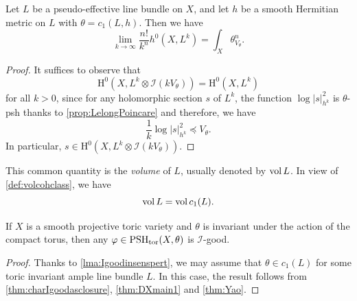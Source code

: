 \begin{corollary}\label{cor:volbigL}
Let $L$ be a pseudo-effective line bundle on $X$, and let $h$ be a smooth Hermitian metric on $L$ with $\theta=c_1(L,h)$. Then we have
    \begin{equation}\label{eq:volbig}
        \lim_{k\to\infty}\frac{n!}{k^n}h^0\left(X,L^k\right)=\int_X \theta_{V_{\theta}}^n.
    \end{equation}
\end{corollary}
\begin{proof}
    It suffices to observe that
    \begin{equation}\label{eq:H0eqH0IVtheta}
        \mathrm{H}^0\left(X,L^k \otimes \mathcal{I}\left(kV_{\theta}\right) \right)=\mathrm{H}^0\left(X,L^k\right)
    \end{equation}
    for all $k>0$, since for any holomorphic section $s$ of $L^k$, the function $\log |s|_{h^k}^2$ is $\theta$-psh thanks to \cref{prop:LelongPoincare} and therefore, we have
    \[
        \frac{1}{k}\log |s|_{h^k}^2\preceq V_{\theta}.
    \]
    In particular, $s\in \mathrm{H}^0\left(X,L^k \otimes \mathcal{I}\left(kV_{\theta}\right) \right)$.
\end{proof}
This common quantity is the \emph{volume} of $L$, usually denoted by $\operatorname{vol} L$. In view of \cref{def:volcohclass}, we have
\begin{equation}\label{eq:volL_volc1L}
\operatorname{vol} L=\operatorname{vol} c_1(L).
\end{equation}




\begin{example}\label{ex:toricIgood}
    If $X$ is a smooth projective toric variety and $\theta$ is invariant under the action of the compact torus, then any $\varphi\in \mathrm{PSH}_{\mathrm{tor}}(X,\theta)$ is $\mathcal{I}$-good.
\end{example}
\begin{proof}
    Thanks to \cref{lma:Igoodinsenspert}, we may assume that $\theta\in c_1(L)$ for some toric invariant ample line bundle $L$. In this case, the result follows from \cref{thm:charIgoodasclosure}, \cref{thm:DXmain1} and \cref{thm:Yao}.
\end{proof}

%

